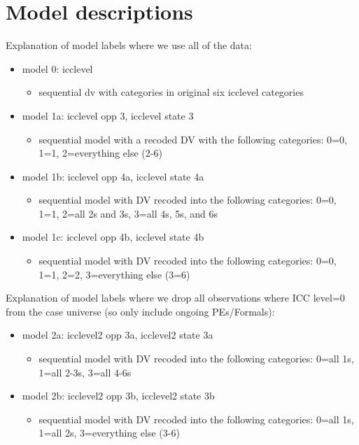\documentclass[]{article}
\begin{document}
\tableofcontents

\clearpage

\section{Model descriptions}

Explanation of model labels where we use all of the data:

\begin{itemize}
	\item model 0: icclevel
	\begin{itemize}
		\item sequential dv with categories in original six icclevel categories
	\end{itemize}
	\item model 1a: icclevel opp 3, icclevel state 3
	\begin{itemize}
		\item sequential model with a recoded DV with the following categories: 0=0, 1=1, 2=everything else (2-6)
	\end{itemize}	
	\item model 1b: icclevel opp 4a, icclevel state 4a
	\begin{itemize}
		\item sequential model with DV recoded into the following categories: 0=0, 1=1, 2=all 2s and 3s, 3=all 4s, 5s, and 6s
	\end{itemize}	
	\item model 1c: icclevel opp 4b, icclevel state 4b
	\begin{itemize}
		\item sequential model with DV recoded into the following categories: 0=0, 1=1, 2=2, 3=everything else (3=6)
	\end{itemize}		
\end{itemize}

Explanation of model labels where we drop all observations where ICC level=0 from the case universe (so only include ongoing PEs/Formals):

\begin{itemize}
	\item model 2a: icclevel2 opp 3a, icclevel2 state 3a
	\begin{itemize}
		\item sequential model with DV recoded into the following categories: 0=all 1s, 1=all 2-3s, 3=all 4-6s
	\end{itemize}
	\item model 2b: icclevel2 opp 3b, icclevel2 state 3b
	\begin{itemize}
		\item sequential model with DV recoded into the following categories: 0=all 1s, 1=all 2s, 3=everything else (3-6)
	\end{itemize}	
\end{itemize}
\end{document}
